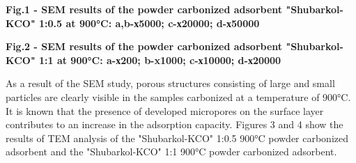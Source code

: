 {\bfseries Fig.1 - SEM results of the powder carbonized adsorbent
"Shubarkol-KCO" 1:0.5 at 900°C:
a,b-х5000; c-х20000; d-х50000}


{\bfseries Fig.2 - SEM results of the powder carbonized adsorbent
"Shubarkol-KCO" 1:1 at 900°C: a-х200;
b-x1000; c-х10000; d-х20000}

As a result of the SEM study, porous structures consisting of large and
small particles are clearly visible in the samples carbonized at a
temperature of 900°C. It is known that the presence of developed
micropores on the surface layer contributes to an increase in the
adsorption capacity. Figures 3 and 4 show the results of TEM analysis of
the "Shubarkol-KCO" 1:0.5 900°C powder
carbonized adsorbent and the
"Shubarkol-KCO" 1:1 900°C powder
carbonized adsorbent.


